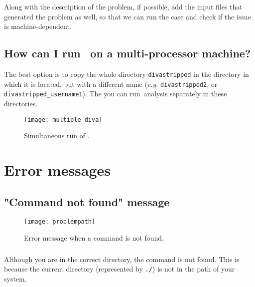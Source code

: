 Along with the description of the problem, if possible, add the input files that generated the problem as well, so that we can run the case and check if the issue is machine-dependent. 

\subsection{How can I run \diva\, on a multi-processor machine?}

The best option is to copy the whole directory \texttt{divastripped} in the directory in which it is located, but with a different name (\textit{e.g.} \texttt{divastripped2}, or \texttt{divastripped\_username1}). The you can run \diva\,analysis separately in these directories. 


\begin{figure}[htpb]
\centering
\texttt{[image: multiple\_diva]}
\caption{Simultaneous run of \diva.}
\end{figure}


\section{Error messages}

\subsection{"Command not found" message}


\begin{figure}[htpb]
\centering
\texttt{[image: problempath]}
\caption{Error message when a command is not found.}
\end{figure}

\subsubsection{\question}

Although you are in the correct directory, the command is not found. This is because the current directory (represented by \texttt{./}) is not in the path of your system. 

\subsubsection{\answer}

